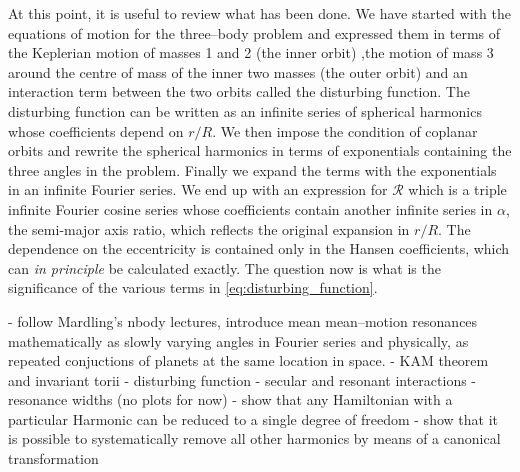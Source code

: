 At this point, it is useful to review what has been done. We have started
with the equations of motion for the three--body problem and expressed them
in terms of the Keplerian motion of masses 1 and 2 (the inner orbit) 
,the motion of mass 3 around the centre of mass of the inner 
two masses (the outer orbit) and an interaction term between the two
orbits called the disturbing function. The disturbing function
can be written as an infinite series of spherical harmonics 
whose coefficients depend on $r/R$. We then impose the 
condition of coplanar orbits and rewrite the spherical harmonics in 
terms of exponentials containing the three angles in the problem. Finally
we expand the terms with the exponentials in an infinite Fourier series.
We end up with an expression for $\mathcal{R}$ which is a triple infinite
Fourier cosine series whose coefficients contain another infinite 
series in $\alpha$, the semi-major axis ratio, which reflects the original
expansion in $r/R$. The dependence on the eccentricity is contained
only in the Hansen coefficients, which can \emph{in principle} be
calculated exactly. The question now is what is the significance
of the various terms in \cref{eq:disturbing_function}.


- follow Mardling's nbody lectures, introduce mean mean--motion
resonances mathematically as slowly varying angles in  Fourier series
and physically, as repeated conjuctions of planets at the same location
in space.
- KAM theorem and invariant torii
- disturbing function
- secular and resonant interactions
- resonance widths (no plots for now)
- show that any Hamiltonian with a particular Harmonic can be reduced to
a single degree of freedom
- show that it is possible to systematically remove all other harmonics
by means of a canonical transformation
